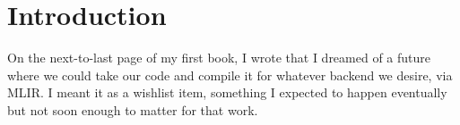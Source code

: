 %

\newcommand{\globalbntodo}{\medskip\noindent\textbf{[TODO: run with global BN.]}}
\newcommand{\depgraphlegend}{The statements of this section and what each stands
on, in the order the proofs compose them. A dashed box is a statement from
elsewhere (its chapter, or above/below in this one); a double border marks a
statement every chapter uses; one that feeds eight or more boxes of its own
figure keeps its box, tagged with the count, and drops the arrows; a statement
that leans on many others shows only
what fits, and its \texttt{\textbackslash uses} line has the rest; one that
stands only on what every chapter uses hangs from the figure's shared box, which
says where those statements live; every box is a link.}

\newcommand{\sqstatus}{\medskip\noindent \textbf{Status: rendered, not trained.}}
\newcommand{\evalckptnote}{$37.5$\,s per epoch of evaluation and checkpointing}

\chapter*{Introduction}
\label{chap:introduction}

On the next-to-last page of my first book, I wrote that I dreamed of a
future where we could take our code and compile it for whatever backend
we desire, via MLIR. I meant it as a wishlist item, something I expected
to happen eventually but not soon enough to matter for that work.

